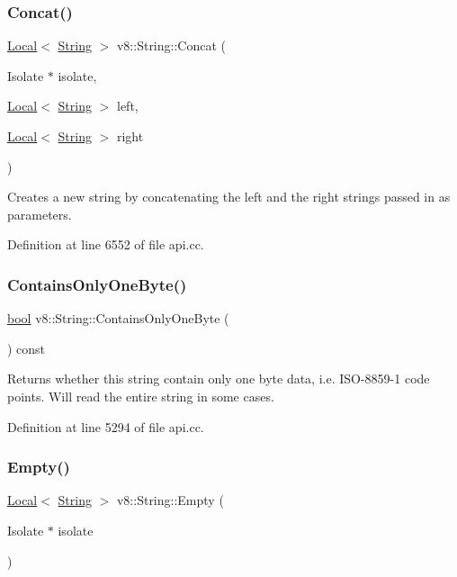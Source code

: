 \subsubsection{\texorpdfstring{Concat()}{Concat()}}
{\footnotesize\ttfamily \mbox{\hyperlink{classv8_1_1Local}{Local}}$<$ \mbox{\hyperlink{classv8_1_1String}{String}} $>$ v8\+::\+String\+::\+Concat (\begin{DoxyParamCaption}\item[{Isolate $\ast$}]{isolate,  }\item[{\mbox{\hyperlink{classv8_1_1Local}{Local}}$<$ \mbox{\hyperlink{classv8_1_1String}{String}} $>$}]{left,  }\item[{\mbox{\hyperlink{classv8_1_1Local}{Local}}$<$ \mbox{\hyperlink{classv8_1_1String}{String}} $>$}]{right }\end{DoxyParamCaption})\hspace{0.3cm}{\ttfamily [static]}}

Creates a new string by concatenating the left and the right strings passed in as parameters. 

Definition at line 6552 of file api.\+cc.

\mbox{\label{classv8_1_1String_a29b9bc5f71fba74af478e806b9d6a1d6}} 
\subsubsection{\texorpdfstring{Contains\+Only\+One\+Byte()}{ContainsOnlyOneByte()}}
{\footnotesize\ttfamily \mbox{\hyperlink{classbool}{bool}} v8\+::\+String\+::\+Contains\+Only\+One\+Byte (\begin{DoxyParamCaption}{ }\end{DoxyParamCaption}) const}

Returns whether this string contain only one byte data, i.\+e. I\+S\+O-\/8859-\/1 code points. Will read the entire string in some cases. 

Definition at line 5294 of file api.\+cc.

\mbox{\label{classv8_1_1String_aa393d47baa54467fe57001065e49194b}} 
\subsubsection{\texorpdfstring{Empty()}{Empty()}}
{\footnotesize\ttfamily \mbox{\hyperlink{classv8_1_1Local}{Local}}$<$ \mbox{\hyperlink{classv8_1_1String}{String}} $>$ v8\+::\+String\+::\+Empty (\begin{DoxyParamCaption}\item[{Isolate $\ast$}]{isolate }\end{DoxyParamCaption})\hspace{0.3cm}{\ttfamily [static]}}

